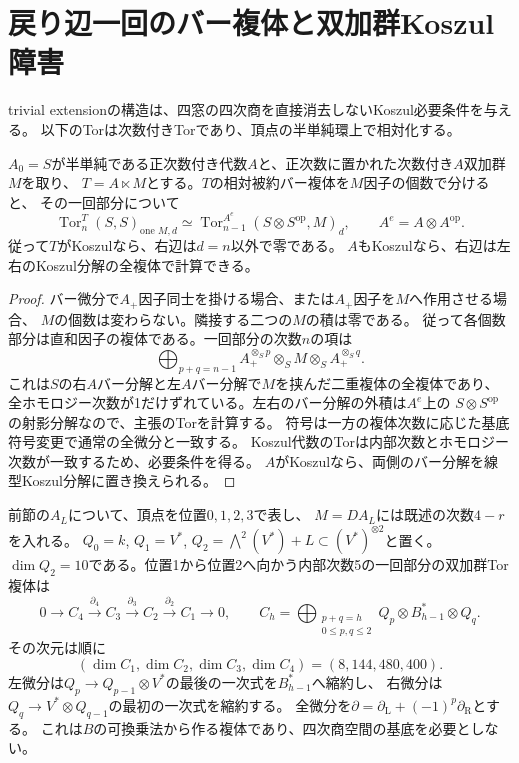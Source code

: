 \section{戻り辺一回のバー複体と双加群Koszul障害}
\label{sec:trivial-extension-bitor}
trivial extensionの構造は、四窓の四次商を直接消去しないKoszul必要条件を与える。
以下のTorは次数付きTorであり、頂点の半単純環上で相対化する。

\begin{proposition}[平方零拡大の一回部分]\label{prop:one-return-bar-tor}
$A_0=S$が半単純である正次数付き代数$A$と、正次数に置かれた次数付き$A$双加群$M$を取り、
$T=A\ltimes M$とする。$T$の相対被約バー複体を$M$因子の個数で分けると、
その一回部分について
\[
 \operatorname{Tor}^{T}_n(S,S)_{\text{one }M,d}
 \simeq\operatorname{Tor}^{A^e}_{n-1}(S\otimes S^{\mathrm{op}},M)_d,
 \qquad A^e=A\otimes A^{\mathrm{op}}.
\]
従って$T$がKoszulなら、右辺は$d=n$以外で零である。
$A$もKoszulなら、右辺は左右のKoszul分解の全複体で計算できる。
\end{proposition}
\begin{proof}
バー微分で$A_+$因子同士を掛ける場合、または$A_+$因子を$M$へ作用させる場合、
$M$の個数は変わらない。隣接する二つの$M$の積は零である。
従って各個数部分は直和因子の複体である。一回部分の次数$n$の項は
\[
 \bigoplus_{p+q=n-1} A_+^{\otimes_Sp}\otimes_S M\otimes_S A_+^{\otimes_Sq}.
\]
これは$S$の右$A$バー分解と左$A$バー分解で$M$を挟んだ二重複体の全複体であり、
全ホモロジー次数が1だけずれている。左右のバー分解の外積は$A^e$上の
$S\otimes S^{\mathrm{op}}$の射影分解なので、主張のTorを計算する。
符号は一方の複体次数に応じた基底符号変更で通常の全微分と一致する。
Koszul代数のTorは内部次数とホモロジー次数が一致するため、必要条件を得る。
$A$がKoszulなら、両側のバー分解を線型Koszul分解に置き換えられる。
\end{proof}

前節の$A_L$について、頂点を位置$0,1,2,3$で表し、
$M=D A_L$には既述の次数$4-r$を入れる。
$Q_0=k$, $Q_1=V^*$,
$Q_2=\bigwedge^2(V^*)+L\subset(V^*)^{\otimes2}$と置く。
$\dim Q_2=10$である。位置1から位置2へ向かう内部次数5の一回部分の双加群Tor複体は
\[
 0\longrightarrow C_4\xrightarrow{\partial_4}C_3
 \xrightarrow{\partial_3}C_2\xrightarrow{\partial_2}C_1\longrightarrow0,
 \qquad
 C_h=\bigoplus_{\substack{p+q=h\\0\leq p,q\leq2}}
 Q_p\otimes B_{h-1}^*\otimes Q_q.
\]
その次元は順に
\[
 (\dim C_1,\dim C_2,\dim C_3,\dim C_4)=(8,144,480,400).
\]
左微分は$Q_p\to Q_{p-1}\otimes V^*$の最後の一次式を$B_{h-1}^*$へ縮約し、
右微分は$Q_q\to V^*\otimes Q_{q-1}$の最初の一次式を縮約する。
全微分を$\partial=\partial_{\mathrm L}+(-1)^p\partial_{\mathrm R}$とする。
これは$B$の可換乗法から作る複体であり、四次商空間の基底を必要としない。

